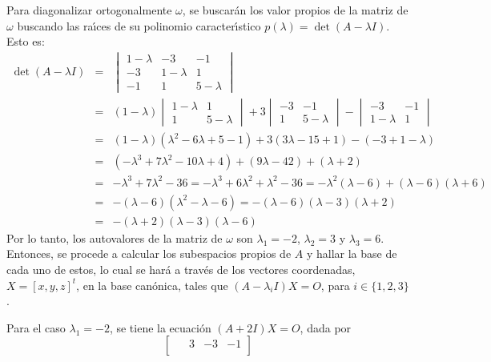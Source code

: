 \begin{solucion}
 Para diagonalizar ortogonalmente $\omega$, se buscar\'an los valor propios de la matriz de $\omega$ buscando las ra\'{\i}ces de su polinomio caracter\'{\i}stico $p(\lambda) = \det(A-\lambda I)$. Esto es:
 \begin{eqnarray*}
  \det(A - \lambda I) & = & 
  \begin{vmatrix}
   1-\lambda & -3 & -1 \\
   -3 & 1-\lambda &  1 \\
   -1 & 1 & 5 - \lambda
  \end{vmatrix}
  \\
  & = & 
  (1-\lambda)
  \begin{vmatrix}
   1-\lambda & 1 \\
   1 & 5-\lambda
  \end{vmatrix}
  +3
  \begin{vmatrix}
   -3 & -1 \\
   1 & 5-\lambda
  \end{vmatrix}
  -
  \begin{vmatrix}
   -3 & -1 \\
   1-\lambda & 1
  \end{vmatrix}
  \\
  & = & (1-\lambda)(\lambda^2 -6\lambda +5 -1) +3(3\lambda -15 +1) -(-3+1-\lambda) \\
  & = & (-\lambda^3 + 7\lambda^2 -10\lambda + 4) + (9\lambda-42)+(\lambda+2) \\ 
  & = & -\lambda^3 + 7\lambda^2 - 36  = -\lambda^3 + 6\lambda^2 + \lambda^2 - 36 = -\lambda^2(\lambda-6) + (\lambda-6)(\lambda+6) \\
  & = & -(\lambda-6)(\lambda^2 - \lambda - 6) = -(\lambda-6)(\lambda-3)(\lambda+2) \\ 
  & = & -(\lambda+2)(\lambda-3)(\lambda-6)
 \end{eqnarray*}
 Por lo tanto, los autovalores de la matriz de $\omega$ son $\lambda_1 = -2$, $\lambda_2 = 3$ y $\lambda_3 = 6$. Entonces, se procede a calcular los subespacios propios de $A$ y hallar la base de cada uno de estos, lo cual se har\'a a trav\'es de los vectores coordenadas, $X = [x,y,z]^t$, en la base can\'onica, tales que $(A-\lambda_i I)X = O$, para $i\in\{1,2,3\}$.
 \par 
 Para  el caso  $\lambda_1 = -2$, se tiene la ecuaci\'on $(A+2I)X = O$, dada por
 \begin{equation*}
  \begin{bmatrix}
   \phantom{-}3 & -3 & -1 \\

\end{bmatrix}
\end{equation*}
\end{solucion}

